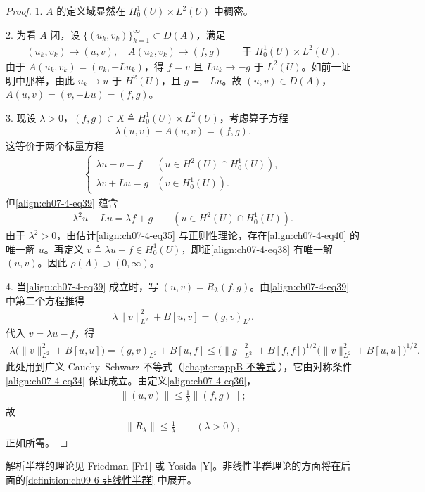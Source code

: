 \documentclass[../../main.tex]{subfiles}
\begin{document}
\begin{proof}
1. $A$ 的定义域显然在 $H^1_0(U)\times L^2(U)$ 中稠密。

2. 为看 $A$ 闭，设 $\{(u_k,v_k)\}_{k=1}^\infty\subset D(A)$，满足
\begin{align*}
(u_k,v_k)\to(u,v),\quad A(u_k,v_k)\to(f,g)\qquad \text{于 } H^1_0(U)\times L^2(U).
\end{align*}
由于 $A(u_k,v_k)=(v_k,-Lu_k)$，得 $f=v$ 且 $Lu_k\to -g$ 于 $L^2(U)$。如前一证明中那样，由此 $u_k\to u$ 于 $H^2(U)$，且 $g=-Lu$。故 $(u,v)\in D(A)$，$A(u,v)=(v,-Lu)=(f,g)$。

3. 现设 $\lambda>0$，$(f,g)\in X\triangleq H^1_0(U)\times L^2(U)$，考虑算子方程
\begin{align}
\lambda(u,v)-A(u,v)=(f,g).\label{align:ch07-4-eq38}
\end{align}
这等价于两个标量方程
\begin{align}
\begin{cases}
\lambda u-v=f & (u\in H^2(U)\cap H^1_0(U)),\\
\lambda v+Lu=g & (v\in H^1_0(U)).
\end{cases}\label{align:ch07-4-eq39}
\end{align}
但\eqref{align:ch07-4-eq39} 蕴含
\begin{align}
\lambda^2 u+Lu=\lambda f+g\qquad (u\in H^2(U)\cap H^1_0(U)).\label{align:ch07-4-eq40}
\end{align}
由于 $\lambda^2>0$，由估计\eqref{align:ch07-4-eq35} 与正则性理论，存在\eqref{align:ch07-4-eq40} 的唯一解 $u$。再定义 $v\triangleq\lambda u-f\in H^1_0(U)$，即证\eqref{align:ch07-4-eq38} 有唯一解 $(u,v)$。因此 $\rho(A)\supset(0,\infty)$。

4. 当\eqref{align:ch07-4-eq39} 成立时，写 $(u,v)=R_\lambda(f,g)$。由\eqref{align:ch07-4-eq39} 中第二个方程推得
\begin{align*}
\lambda\|v\|_{L^2}^2+B[u,v]=(g,v)_{L^2}.
\end{align*}
代入 $v=\lambda u-f$，得
\begin{align*}
\lambda\bigl(\|v\|_{L^2}^2+B[u,u]\bigr)=(g,v)_{L^2}+B[u,f]
\leqslant \bigl(\|g\|_{L^2}^2+B[f,f]\bigr)^{1/2}\bigl(\|v\|_{L^2}^2+B[u,u]\bigr)^{1/2}.
\end{align*}
此处用到广义 Cauchy--Schwarz 不等式（\cref{chapter:appB-不等式}），它由对称条件\eqref{align:ch07-4-eq34} 保证成立。由定义\eqref{align:ch07-4-eq36}，
\begin{align*}
\|(u,v)\|\leqslant\frac{1}{\lambda}\|(f,g)\|;
\end{align*}
故
\begin{align*}
\|R_\lambda\|\leqslant\frac{1}{\lambda}\qquad (\lambda>0),
\end{align*}
正如所需。
\end{proof}

解析半群的理论见 Friedman [Fr1] 或 Yosida [Y]。非线性半群理论的方面将在后面的\cref{definition:ch09-6-非线性半群} 中展开。
\end{document}

